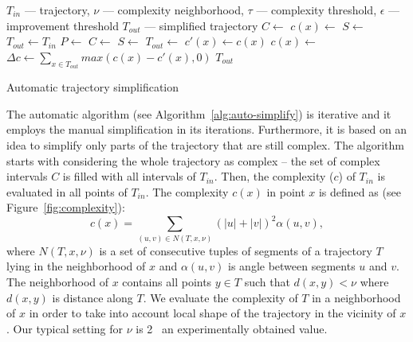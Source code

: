 \begin{algorithm}
  \begin{algorithmic}[1]
	  \Require $T_{in}$ --- trajectory, $\nu$ --- complexity neighborhood, $\tau$ --- complexity threshold, $\epsilon$ --- improvement threshold
	  \Ensure $T_{out}$ --- simplified trajectory
			\State $C \gets$  
			\State $c(x) \gets$ 
			\State
			\State $S \gets$  
			\State $T_{out} \gets T_{in}$
			\Repeat
			  \State $P \gets$ 
				\State $C \gets$ 
			  \State
				  \State $S \gets$ 
					\State $T_{out} \gets$ 
			  \EndFor
				\State
				\State $c'(x) \gets c(x)$ %
				\State $c(x) \gets$ 
				\State
				\State $\Delta c \gets \sum_{x \in T_{out}}{max(c(x) - c'(x), 0)}$
				\State {}
			\State
			\State \Return $T_{out}$
		\EndProcedure
  \end{algorithmic}
	\caption{Automatic trajectory simplification}
  \label{alg:auto-simplify}
\end{algorithm}

The automatic algorithm (see Algorithm~\ref{alg:auto-simplify}) is iterative and it employs the manual simplification in its iterations.
Furthermore, it is based on an idea to simplify only parts of the trajectory that are still complex.
The algorithm starts with considering the whole trajectory as complex -- the set of complex intervals $C$ is filled with all intervals of $T_{in}$.
Then, the complexity ($c$) of $T_{in}$ is evaluated in all points of $T_{in}$.
The complexity $c(x)$ in point $x$ is defined as (see Figure~\ref{fig:complexity}):
\begin{equation}
  c(x) = \sum_{(u, v) \in N(T, x, \nu)}{(|u| + |v|)^2 \alpha(u, v)}, %
\label{eq:complexity}
\end{equation}
where $N(T, x, \nu)$ is a set of consecutive tuples of segments of a trajectory $T$ lying in the neighborhood of $x$ and $\alpha(u, v)$ is angle between segments $u$ and $v$.
The neighborhood of $x$ contains all points $y \in T$ such that $d(x, y) < \nu$ where $d(x, y)$ is distance along $T$.
We evaluate the complexity of $T$ in a neighborhood of $x$ in order to take into account local shape of the trajectory in the vicinity of $x$.
Our typical setting for $\nu$ is 2 \angstrom\, an experimentally obtained value.

